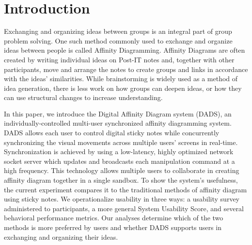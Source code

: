 \documentclass{sigchi}
\begin{document}



\section{Introduction}
Exchanging and organizing ideas between groups is an integral part of group problem solving. One such method commonly used to exchange and organize ideas between people is called Affinity Diagramming\cite{kawakita1991original}. Affinity Diagrams are often created by writing individual ideas on Post-IT notes and, together with other participants, move and arrange the notes to create groups and links in accordance with the ideas' similarities. While brainstorming is widely used as a method of idea generation, there is less work on how groups can deepen ideas, or how they can use structural changes to increase understanding.\cite{dickey2012framespaces}

In this paper, we introduce the Digital Affinity Diagram system (DADS), an individually-controlled multi-user synchronized affinity diagramming system. DADS allows each user to control digital sticky notes while concurrently synchronizing the visual movements across multiple users' screens in real-time. Synchronization is achieved by using a low-latency, highly optimized network socket server which updates and broadcasts each manipulation command at a high frequency. This technology allows multiple users to collaborate in creating affinity diagram together in a single sandbox. To show the system's usefulness, the current experiment compares it to the traditional methods of affinity diagram using sticky notes. We operationalize usability in three ways: a usability survey administered to participants, a more general System Usability Score, and several behavioral performance metrics. Our analyses determine which of the two methods is more preferred by users and whether DADS supports users in exchanging and organizing their ideas.
\end{document}
